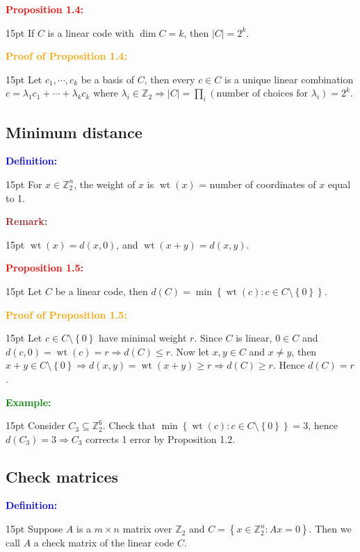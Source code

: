 \documentclass[12pt]{article}
\newcommand{\noparskip}{\vspace{-\parskip}}
\newenvironment{dent}
	{\begin{adjustwidth}{15pt}{}\noparskip}
	{\end{adjustwidth}}
\newenvironment{result}[1]
	{\textcolor{Red}{\textbf{#1:}}\begin{dent}}
	{\end{dent}}
\newenvironment{proof}[1]
	{\textcolor{Orange}{\textbf{Proof of #1:}}\begin{dent}}
	{\end{dent}}
\newenvironment{definition}
	{\textcolor{Blue}{\textbf{Definition:}}\begin{dent}}
	{\end{dent}}
\newenvironment{example}
	{\textcolor{Green}{\textbf{Example:}}\begin{dent}}
	{\end{dent}}
\newenvironment{remark}
	{\textcolor{Brown}{\textbf{Remark:}}\begin{dent}}
	{\end{dent}}
\renewcommand{\implies}{\Rightarrow}
\newcommand{\set}[1]{\left\{ #1 \right\}}
\newcommand{\sizeof}[1]{\left| #1 \right|}
\newcommand{\Z}{\mathbb{Z}}
\newcommand{\wt}[1]{\operatorname{wt}(#1)}
\begin{document}
\begin{result}{Proposition 1.4}
If $C$ is a linear code with $\dim C = k$, then $\sizeof{C} = 2^k$.
\end{result}

\begin{proof}{Proposition 1.4}
Let $c_1, \cdots, c_k$ be a basis of $C$, then every $c \in C$ is a unique linear combination $c = \lambda_1 c_1 + \cdots + \lambda_k c_k$ where $\lambda_i \in \Z_2 \implies \sizeof{C} = \prod_i{(\text{number of choices for }\lambda_i)} = 2^k$.
\end{proof}

\subsection{Minimum distance}

\begin{definition}
For $x \in \Z_2^n$, the weight of $x$ is $\wt{x}$ = number of coordinates of $x$ equal to 1.
\end{definition}

\begin{remark}
$\wt{x} = d(x, 0)$, and $\wt{x + y} = d(x, y)$.
\end{remark}

\begin{result}{Proposition 1.5}
Let $C$ be a linear code, then $d(C) = \min \set{\wt{c}: c \in C \setminus \set{0}}$.
\end{result}

\begin{proof}{Proposition 1.5}
Let $c \in C \setminus \set{0}$ have minimal weight $r$. Since $C$ is linear, $0 \in C$ and $d(c, 0) = \wt{c} = r \implies d(C) \le r$. Now let $x, y \in C$ and $x \ne y$, then $x + y \in C \setminus \set{0} \implies d(x, y) = \wt{x + y} \ge r \implies d(C) \ge r$. Hence $d(C) = r$.
\end{proof}

\begin{example}
Consider $C_3 \subseteq \Z_2^6$. Check that $\min \set{\wt{c}: c \in C \setminus \set{0}} = 3$, hence $d(C_3) = 3 \implies C_3$ corrects 1 error by Proposition 1.2.
\end{example}

\subsection{Check matrices}

\begin{definition}
Suppose $A$ is a $m \times n$ matrix over $\Z_2$ and $C = \set{x \in \Z_2^n: Ax = 0}$. Then we call $A$ a check matrix of the linear code $C$.
\end{definition}
\end{document}
